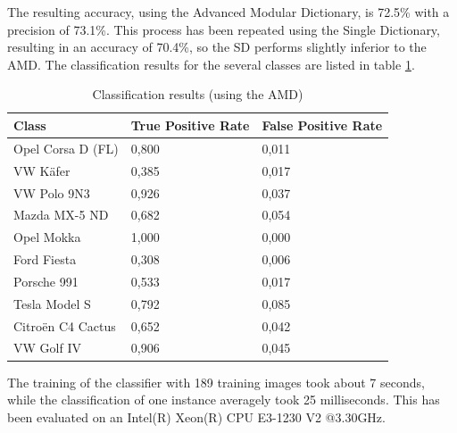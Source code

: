 The resulting accuracy, using the Advanced Modular Dictionary, is 72.5\% with a precision of 73.1\%. This process has been repeated using the Single Dictionary, resulting in an accuracy of 70.4\%, so the SD performs slightly inferior to the AMD. The classification results for the several classes are listed in table \ref{table:classificationResults}.
\begin{table}[btph]
    \centering
    \begin{tabular}{ | l | l | l |}
    \hline
    \textbf{Class} & \textbf{True Positive Rate} & \textbf{False Positive Rate} \\ \hline
    Opel Corsa D (FL)  & 0,800 &  0,011 \\ \hline
    VW K\"afer & 	0,385 &  0,017 \\ \hline
    VW Polo 9N3  & 	0,926 &  0,037 \\ \hline
    Mazda MX-5 ND  & 0,682 &  0,054 \\ \hline
    Opel Mokka & 	1,000 &  0,000 \\ \hline
    Ford Fiesta  & 	0,308 &  0,006 \\ \hline
    Porsche 991  & 	0,533 &  0,017 \\ \hline
    Tesla Model S  & 0,792 &  0,085 \\ \hline
    Citro\"en C4 Cactus & 	0,652 &  0,042 \\ \hline
    VW Golf IV  & 	0,906 &  0,045 \\ \hline
    \end{tabular}
    \caption{Classification results (using the AMD)}
    \label{table:classificationResults}
\end{table}
The training of the classifier with 189 training images took about 7 seconds, while the classification of one instance averagely took 25 milliseconds. This has been evaluated on an Intel(R) Xeon(R) CPU E3-1230 V2 @3.30GHz.

